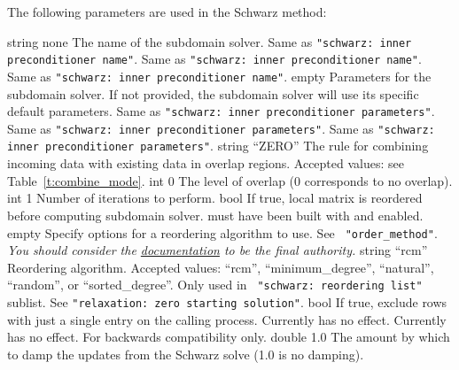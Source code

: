 The following parameters are used in the Schwarz method:

    {string}
    {none}
    {The name of the subdomain solver.}
    {Same as {\tt "schwarz: inner preconditioner name"}.}
    {Same as {\tt "schwarz: inner preconditioner name"}.}
    {Same as {\tt "schwarz: inner preconditioner name"}.}
    {\parameterlist}
    {empty}
    {Parameters for the subdomain solver. If not provided, the subdomain solver
     will use its specific default parameters.}
    {Same as {\tt "schwarz: inner preconditioner parameters"}.}
    {Same as {\tt "schwarz: inner preconditioner parameters"}.}
    {Same as {\tt "schwarz: inner preconditioner parameters"}.}
    {string}
    {``ZERO''}
    {The rule for combining incoming data with existing data in overlap regions.
     Accepted values: see Table~\ref{t:combine_mode}.}
    {int}
    {0}
    {The level of overlap (0 corresponds to no overlap).}
    {int}
    {1}
    {Number of iterations to perform.}
    {bool}
    {\false}
    {If true, local matrix is reordered before computing subdomain solver. \trilinos must have been built with
     \zoltantwo and \xpetra enabled.}
    {\parameterlist}
    {empty}
    {Specify options for a \zoltantwo reordering algorithm to use. See {\tt
     "order\_method"}. {\em You should consider the
     \href{http://trilinos.org/docs/dev/packages/zoltan2/doc/html/z2_parameters.html}{\zoltantwo
     documentation} to be the final authority.}}
    {string}
    {``rcm''}
    {Reordering algorithm. Accepted values: ``rcm'', ``minimum\_degree'',
     ``natural'', ``random'', or ``sorted\_degree''. Only used in {\tt
     "schwarz: reordering list"} sublist.}
    {See {\tt "relaxation: zero starting solution"}.}
    {bool}
    {\false}
    {If true, exclude rows with just a single entry on the calling process.}
    {Currently has no effect.}
    {Currently has no effect. For backwards compatibility only.}
    {double}
    {1.0}
    {The amount by which to damp the updates from the Schwarz solve
      (1.0 is no damping).}
